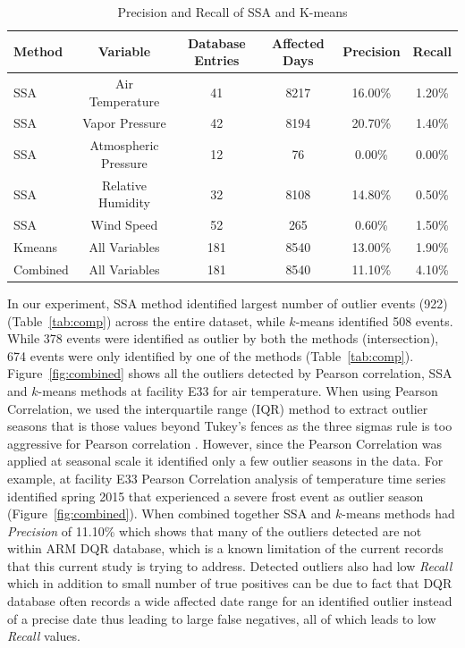 \begin{table}[ht]
\caption{Precision and Recall of SSA and K-means}
\label{tab:pr}
\centering
\begin{tabular}{|l|c|c|c|c|c|}
\hline
Method & Variable & Database Entries & Affected Days & Precision & Recall\\
\hline
SSA & Air Temperature & 41 & 8217 & 16.00\% & 1.20\%\\
SSA & Vapor Pressure & 42 & 8194 & 20.70\% & 1.40\%\\
SSA & Atmospheric Pressure & 12 & 76 & 0.00\% & 0.00\%\\
SSA & Relative Humidity & 32 & 8108 & 14.80\% & 0.50\%\\
SSA & Wind Speed & 52 & 265 & 0.60\% & 1.50\%\\
Kmeans & All Variables & 181 & 8540 & 13.00\% & 1.90\%\\
Combined & All Variables & 181 & 8540 & 11.10\% & 4.10\%\\
\hline
\end{tabular}
\end{table}

In our experiment, SSA method identified largest number of outlier events (922)
(Table~\ref{tab:comp}) across the entire dataset, while $k$-means
identified 508 events. While 378 events were identified as outlier by
both the methods (intersection), 674 events were only identified by one
of the methods (Table~\ref{tab:comp}).
Figure~\ref{fig:combined} shows all the outliers detected by Pearson correlation, SSA and
$k$-means methods at facility E33 for air temperature. 
When using Pearson Correlation, we used 
the interquartile range (IQR) method to extract outlier seasons that 
is those values beyond Tukey's fences as the three sigmas rule is too 
aggressive for Pearson correlation \cite{tukey1977exploratory}. 
However, since the Pearson Correlation was applied at seasonal scale it
identified only a few outlier seasons in the data. For example, at
facility E33 Pearson Correlation analysis of temperature time series
identified spring 2015 that experienced a severe frost event as outlier
season (Figure~\ref{fig:combined}).
When combined together SSA and $k$-means methods had \textit{Precision} of 
11.10\% which shows that many of the outliers
detected are not within ARM DQR database, which is a known limitation of
the current records that this current study is trying to address.
Detected outliers also had low \textit{Recall} which in addition to small
number of true positives can be due to fact that DQR database often
records a wide affected date range for an identified outlier instead of a
precise date thus leading to large false negatives, all of which leads
to low \textit{Recall} values.

